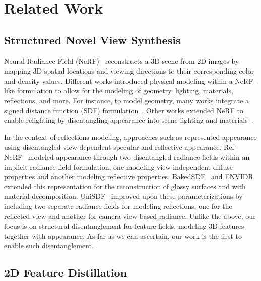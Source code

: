 \section{Related Work} \label{sec:related}

\subsection{Structured Novel View Synthesis}

Neural Radiance Field (NeRF)~\cite{mildenhall2021nerf} reconstructs a 3D scene from 2D images by mapping 3D spatial locations and viewing directions to their corresponding color and density values. %
Different works introduced physical modeling within a NeRF-like formulation to allow for the modeling of geometry, lighting, materials, reflections, and more. 
For instance, to model geometry, many works integrate a signed distance function (SDF) formulation~\cite{li2023neuralangelo, long2022sparseneus, oechsle2021unisurf, rosu2023permutosdf, wang2021neus, yariv2021volume, yu2022monosdf}. 
Other works extended NeRF to enable relighting by disentangling appearance into scene lighting and materials~\cite{bi2020neural, boss2021nerd, boss2021neural, srinivasan2021nerv, zhang2021physg, zhang2021nerfactor}. 



In the context of reflections modeling,  approaches such as \cite{ramamoorthi2009precomputation} represented appearance using disentangled view-dependent specular and reflective appearance. 
Ref-NeRF~\cite{verbin2022refnerf} modeled appearance through two disentangled radiance fields within an implicit radiance field formulation, one modeling view-independent diffuse properties and another modeling reflective properties.
BakedSDF~\cite{yariv2023bakedsdf} and  ENVIDR~\cite{liang2023envidr} extended this representation for the reconstruction of glossy surfaces and with material decomposition. UniSDF~\cite{wang2023unisdf} improved upon these parameterizations by including two separate radiance fields for modeling reflections, one for the reflected view and another for camera view based radiance. 
Unlike the above, our focus is on structural disentanglement for feature fields, modeling 3D features together with appearance. As far as we can ascertain, our work is the first to enable such disentanglement. 








\subsection{2D Feature Distillation}

